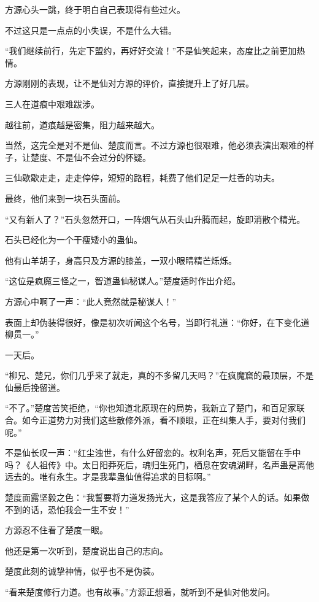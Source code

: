 
\begin{this_body}

方源心头一跳，终于明白自己表现得有些过火。

不过这只是一点点的小失误，不是什么大错。

“我们继续前行，先定下盟约，再好好交流！”不是仙笑起来，态度比之前更加热情。

方源刚刚的表现，让不是仙对方源的评价，直接提升上了好几层。

三人在道痕中艰难跋涉。

越往前，道痕越是密集，阻力越来越大。

当然，这完全是对不是仙、楚度而言。不过方源也很艰难，他必须表演出艰难的样子，让楚度、不是仙不会过分的怀疑。

三仙歇歇走走，走走停停，短短的路程，耗费了他们足足一炷香的功夫。

最终，他们来到一块石头面前。

“又有新人了？”石头忽然开口，一阵烟气从石头山升腾而起，旋即消散个精光。

石头已经化为一个干瘦矮小的蛊仙。

他有山羊胡子，身高只及方源的膝盖，一双小眼睛精芒烁烁。

“这位是疯魔三怪之一，智道蛊仙秘谋人。”楚度适时作出介绍。

方源心中啊了一声：“此人竟然就是秘谋人！”

表面上却伪装得很好，像是初次听闻这个名号，当即行礼道：“你好，在下变化道柳贯一。”

一天后。

“柳兄、楚兄，你们几乎来了就走，真的不多留几天吗？”在疯魔窟的最顶层，不是仙最后挽留道。

“不了。”楚度苦笑拒绝，“你也知道北原现在的局势，我新立了楚门，和百足家联合。如今正道势力对我们这些散修外派，看不顺眼，正在纠集人手，要对付我们呢。”

不是仙长叹一声：“红尘浊世，有什么好留恋的。权利名声，死后又能留在手中吗？《人祖传》中。太日阳莽死后，魂归生死门，栖息在安魂湖畔，名声蛊是离他远去的。唯有永生。才是我辈蛊仙值得追求的目标啊。”

楚度面露坚毅之色：“我誓要将力道发扬光大，这是我答应了某个人的话。如果做不到的话，恐怕我会一生不安！”

方源忍不住看了楚度一眼。

他还是第一次听到，楚度说出自己的志向。

楚度此刻的诚挚神情，似乎也不是伪装。

“看来楚度修行力道。也有故事。”方源正想着，就听到不是仙对他发问。


\end{this_body}
